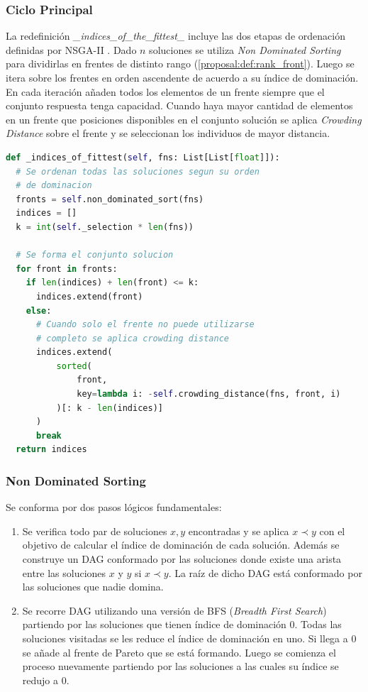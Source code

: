 \subsubsection{Ciclo Principal}
La redefinici\'on \textit{\_indices\_of\_the\_fittest\_} incluye las dos etapas de ordenaci\'on definidas por NSGA-II . Dado $n$ soluciones se utiliza \textit{Non Dominated Sorting} para dividirlas en frentes de distinto rango (\ref{proposal:def:rank_front}). Luego se itera sobre los frentes en orden ascendente de acuerdo a su \'indice de dominaci\'on. En cada iteraci\'on a\~naden todos los elementos de un frente siempre que el conjunto respuesta tenga capacidad. Cuando haya  mayor cantidad de elementos en un frente que posiciones disponibles en el conjunto soluci\'on se aplica \textit{Crowding Distance} sobre el frente y se seleccionan los individuos de mayor distancia.

\begin{lstlisting}[caption=Nueva ordenaci\'on, language=Python]
def _indices_of_fittest(self, fns: List[List[float]]):
  # Se ordenan todas las soluciones segun su orden
  # de dominacion
  fronts = self.non_dominated_sort(fns)
  indices = []
  k = int(self._selection * len(fns))

  # Se forma el conjunto solucion
  for front in fronts:
    if len(indices) + len(front) <= k:
      indices.extend(front)
    else:
      # Cuando solo el frente no puede utilizarse
      # completo se aplica crowding distance
      indices.extend(
          sorted(
              front,
              key=lambda i: -self.crowding_distance(fns, front, i)
          )[: k - len(indices)]
      )
      break
  return indices
\end{lstlisting}

\subsubsection{Non Dominated Sorting}
Se conforma por dos pasos l\'ogicos fundamentales:
\begin{enumerate}
    \item Se verifica todo par de soluciones $x, y$ encontradas y se aplica $x \prec y$ con el objetivo de calcular el \'indice de dominaci\'on de cada soluci\'on. Adem\'as se construye un DAG conformado por las soluciones donde existe una arista entre las soluciones $x$ y $y$ si $x \prec y$. La ra\'iz de dicho DAG est\'a conformado por las soluciones que nadie domina.
    \item Se recorre DAG utilizando una versi\'on de BFS (\textit{Breadth First Search}) partiendo por las soluciones que tienen \'indice de dominaci\'on 0. Todas las soluciones visitadas se les reduce el \'indice de dominaci\'on en uno. Si llega a 0 se a\~nade al frente de Pareto que se est\'a formando. Luego se comienza el proceso nuevamente partiendo por las soluciones a las cuales su \'indice se redujo a 0.
\end{enumerate}

